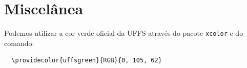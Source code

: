 \documentclass[serif, brazilian]{uffstex}
\begin{document}
\chapter{Miscelânea}

\textcolor{uffsgreen}{Podemos utilizar a cor verde oficial da UFFS através
do pacote \texttt{xcolor} e do comando:}

\begin{verbatim}
  \providecolor{uffsgreen}{RGB}{0, 105, 62}
\end{verbatim}

\postextual

\printbibliography[heading=abnt]
\end{document}
